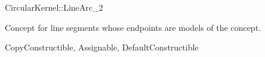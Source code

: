 \begin{ccRefConcept}{CircularKernel::LineArc_2}

\ccDefinition

Concept for line segments whose endpoints are models of the 
 concept. 

\ccRefines
CopyConstructible, Assignable, DefaultConstructible

\ccHasModels
{}

\end{ccRefConcept}
